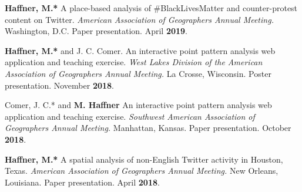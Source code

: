 \begin{cventries}
  \cventry
  {}
  {}
  {}
  {}
  {
    \begin{cvitems}
      \vspace{-2mm}
    \item {\textbf{Haffner, M.*} A place-based analysis of \#BlackLivesMatter
        and counter-protest content on Twitter.
        \textit{American Association of Geographers Annual Meeting.} Washington, D.C.
        Paper presentation. April \textbf{2019}.}
    \end{cvitems}
  } %

   \cventry
      {}
      {}
      {}
      {}
      {
        \begin{cvitems}
          \vspace{-2mm}
        \item {\textbf{Haffner, M.*} and J. C. Comer.  An interactive
            point pattern analysis web application and teaching exercise.
             \textit{West Lakes Division of the American Association of Geographers Annual
               Meeting.} La Crosse, Wisconsin.
            Poster presentation. November \textbf{2018}.}
          \end{cvitems}
        } %

   \cventry
      {}
      {}
      {}
      {}
      {
        \begin{cvitems}
          \vspace{-2mm}
        \item {Comer, J. C.* and \textbf{M. Haffner} An interactive
            point pattern analysis web application and teaching exercise.
             \textit{Southwest American Association of Geographers Annual
               Meeting.} Manhattan, Kansas.
            Paper presentation. October \textbf{2018}.}
          \end{cvitems}
        } %

   \cventry
      {}
      {}
      {}
      {}
      {
        \begin{cvitems}
          \vspace{-2mm}
        \item {\textbf{Haffner, M.*} A spatial analysis of non-English Twitter
            activity in Houston, Texas.
             \textit{American Association of Geographers Annual Meeting.} New Orleans, Louisiana.
            Paper presentation. April \textbf{2018}.}
          \end{cvitems}
        } %


\end{cventries}
